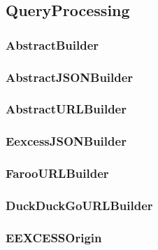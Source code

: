 \subsection{QueryProcessing}
\subsubsection{AbstractBuilder}
\subsubsection{AbstractJSONBuilder}
\subsubsection{AbstractURLBuilder}
\subsubsection{EexcessJSONBuilder}
\subsubsection{FarooURLBuilder}
\subsubsection{DuckDuckGoURLBuilder}
\subsubsection{EEXCESSOrigin}

